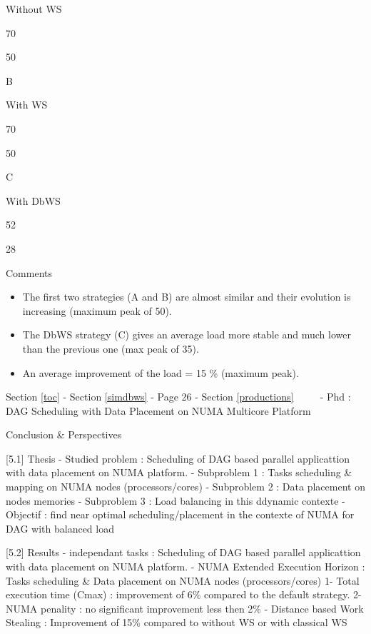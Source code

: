 \documentclass[11pt]{article}
\providecommand{\tightlist}{%
      \setlength{\itemsep}{0pt}\setlength{\parskip}{0pt}}
\begin{document}
Without WS

\textbar{}

70

\textbar{}

50

\textbar{} \textbar{}

B \textbar{}

With WS

\textbar{}

70

\textbar{}

50

\textbar{} \textbar{}

C \textbar{}

With DbWS

\textbar{}

52

\textbar{}

28

Comments

\begin{itemize}
\tightlist
\item
  The first two strategies (A and B) are almost similar and their
  evolution is increasing (maximum peak of 50).
\item
  The DbWS strategy (C) gives an average load more stable and much lower
  than the previous one (max peak of 35).
\item
  An average improvement of the load = 15 \% (maximum peak).
\end{itemize}

     {Section \ref{toc} - Section \ref{simdbws} - Page 26 -
Section \ref{productions} ~~~~ - Phd : DAG Scheduling with Data
Placement on NUMA Multicore Platform}

Conclusion \& Perspectives

{[}5.1{]} Thesis - Studied problem : Scheduling of DAG based parallel
applicattion with data placement on NUMA platform. - Subproblem 1 :
Tasks scheduling \& mapping on NUMA nodes (processors/cores) -
Subproblem 2 : Data placement on nodes memories - Subproblem 3 : Load
balancing in this ddynamic contexte - Objectif : find near optimal
scheduling/placement in the contexte of NUMA for DAG with balanced load

{[}5.2{]} Results - independant tasks : Scheduling of DAG based parallel
applicattion with data placement on NUMA platform. - NUMA Extended
Execution Horizon : Tasks scheduling \& Data placement on NUMA nodes
(processors/cores) 1- Total execution time (Cmax) : improvement of 6\%
compared to the default strategy. 2- NUMA penality : no significant
improvement less then 2\% - Distance based Work Stealing : Improvement
of 15\% compared to without WS or with classical WS
\end{document}
